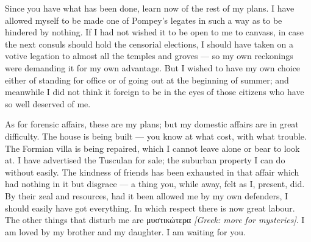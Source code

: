  Since you have what has been done, learn now of the rest of my plans. I have allowed myself to be made one of Pompey's legates in such a way as to be hindered by nothing. If I had not wished it to be open to me to canvass, in case the next consuls should hold the censorial elections, I should have taken on a votive legation to almost all the temples and groves --- so my own reckonings were demanding it for my own advantage. But I wished to have my own choice either of standing for office or of going out at the beginning of summer; and meanwhile I did not think it foreign to be in the eyes of those citizens who have so well deserved of me.

 As for forensic affairs, these are my plans; but my domestic affairs are in great difficulty. The house is being built --- you know at what cost, with what trouble. The Formian villa is being repaired, which I cannot leave alone or bear to look at. I have advertised the Tusculan for sale; the suburban property I can do without easily. The kindness of friends has been exhausted in that affair which had nothing in it but disgrace --- a thing you, while away, felt as I, present, did. By their zeal and resources, had it been allowed me by my own defenders, I should easily have got everything. In which respect there is now great labour. The other things that disturb me are \textgreek{μυστικώτερα} \textit{[Greek: more for mysteries]}. I am loved by my brother and my daughter. I am waiting for you.
